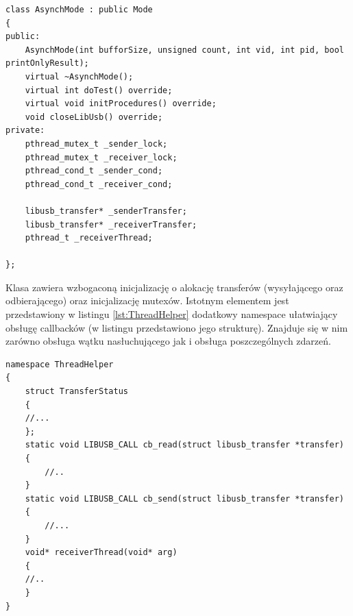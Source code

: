 \documentclass{BscUS}
\begin{document}
\begin{lstlisting}[caption={Deklaracja klasy AsynchMode},label={lst:CAsynchMode}]
class AsynchMode : public Mode
{
public:
	AsynchMode(int bufforSize, unsigned count, int vid, int pid, bool printOnlyResult);
	virtual ~AsynchMode();
	virtual int doTest() override;
	virtual void initProcedures() override;
	void closeLibUsb() override;
private:
	pthread_mutex_t _sender_lock;
	pthread_mutex_t _receiver_lock;
	pthread_cond_t _sender_cond;
	pthread_cond_t _receiver_cond;

	libusb_transfer* _senderTransfer;
	libusb_transfer* _receiverTransfer;
	pthread_t _receiverThread;

};
\end{lstlisting}
Klasa zawiera wzbogaconą inicjalizację o alokację transferów (wysyłającego oraz odbierającego) oraz inicjalizację mutexów.
Istotnym elementem jest przedstawiony w listingu \ref{lst:ThreadHelper} dodatkowy namespace ułatwiający obsługę callbacków (w listingu przedstawiono jego strukturę). Znajduje się w nim zarówno obsługa wątku nasłuchującego jak i obsługa poszczególnych zdarzeń.
\begin{lstlisting}[caption={Struktura przestrzeni nazw oraz odpowiednich struktur do poprawnej obslugi wątków},label={lst:ThreadHelper}]
namespace ThreadHelper
{
	struct TransferStatus
	{
	//...
	};
	static void LIBUSB_CALL cb_read(struct libusb_transfer *transfer)
	{
		//..
	}
	static void LIBUSB_CALL cb_send(struct libusb_transfer *transfer)
	{
		//...
	}	
	void* receiverThread(void* arg)
	{
	//..
	}
}
\end{lstlisting}
\end{document}
